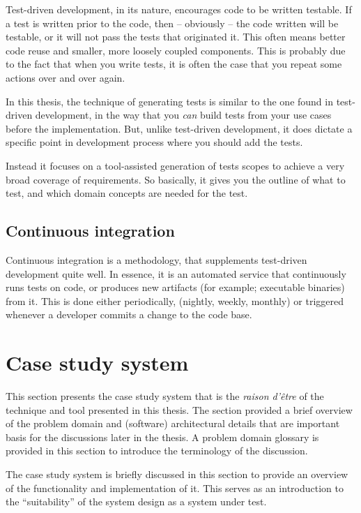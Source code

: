 \noindent Test-driven development, in its nature, encourages code to be written testable. If a test is written prior to the code, then -- obviously -- the code written will be testable, or it will not pass the tests that originated it. This often means better code reuse and smaller, more loosely coupled components\cite{george2003}. This is probably due to the fact that when you write tests, it is often the case that you repeat some actions over and over again.\medskip

\noindent In this thesis, the technique of generating tests is similar to the one found in test-driven development, in the way that you \emph{can} build tests from your use cases before the implementation. But, unlike test-driven development, it does dictate a specific point in development process where you should add the tests.\smallskip

\noindent Instead it focuses on a tool-assisted generation of tests scopes to achieve a very broad coverage of requirements. So basically, it gives you the outline of what to test, and which domain concepts are needed for the test.

\subsection{Continuous integration}
Continuous integration is a methodology, that supplements test-driven development quite well. In essence, it is an automated service that continuously runs tests on code, or produces new artifacts (for example; executable binaries) from it. This is done either periodically, (nightly, weekly, monthly) or triggered whenever a developer commits a change to the code base.

\section{Case study system}
\label{sec:case-study-system}
This section presents the case study system that is the \emph{raison d'être} of the technique and tool presented in this thesis. The section provided a brief overview of the problem domain and (software) architectural details that are important basis for the discussions later in the thesis. A problem domain glossary is provided in this section to introduce the terminology of the discussion.\medskip

\noindent The case study system is briefly discussed in this section to provide an overview of the functionality and implementation of it. This serves as an introduction to the ``suitability'' of the system design as a system under test.\medskip

